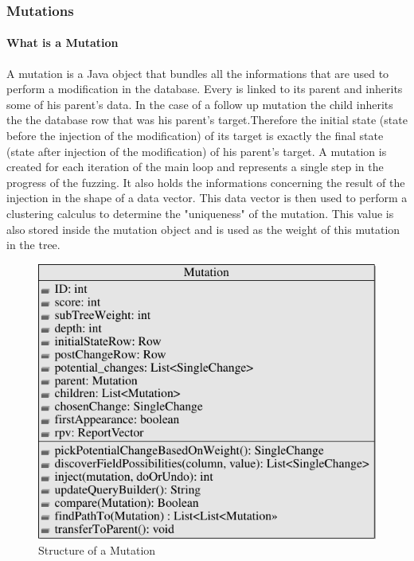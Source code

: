 \documentclass{article}
\begin{document}
\begin{empfile}
  				
			\subsubsection{Mutations}
				\paragraph{What is a Mutation}
A mutation is a Java object that bundles all the informations that are used to perform a modification in the database. Every is linked to its parent and inherits some of his parent's data. In the case of a follow up mutation the child inherits the the database row that was his parent's target.Therefore the initial state (state before the injection of the modification) of its target is exactly the final state (state after injection of the modification) of his parent's target. A mutation is created for each iteration of the main loop and represents a single step in the progress of the fuzzing.
It also holds the informations concerning the result of the injection in the shape of a data vector. This data vector is then used to perform a clustering calculus to determine the "uniqueness" of the mutation. This value is also stored inside the mutation object and is used as the weight of this mutation in the tree.

\begin{figure} [h!]
\centering
\includegraphics[width=\textwidth]{MutationClassDiagram-1.pdf}
\caption{Structure of a Mutation}
\end{figure}


\end{empfile}
\end{document}
